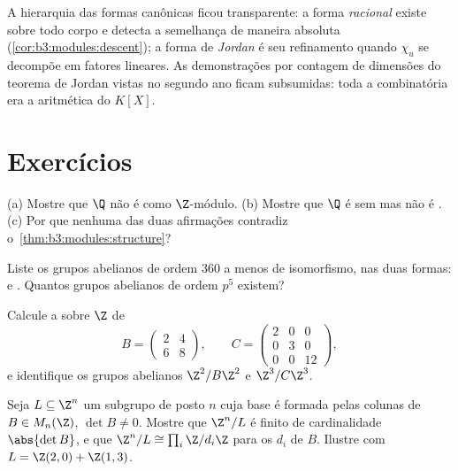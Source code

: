 \begin{remark}\label{rem:b3:modules:overview}
A hierarquia das formas canônicas ficou transparente: a forma
\emph{racional} existe sobre todo corpo e detecta a semelhança de
maneira absoluta (\cref{cor:b3:modules:descent}); a forma de \emph{Jordan} é seu
refinamento quando $\chi_u$ se decompõe em fatores lineares. As
demonstrações por contagem de dimensões do teorema de Jordan vistas no
segundo ano ficam subsumidas: toda a combinatória era a aritmética do
 $K[X]$.
\end{remark}

\section{Exercícios}

\begin{exercise}[$\star$]\label{exo:b3:modules:1}
(a) Mostre que $\Q$ não é  como $\Z$-módulo.
(b) Mostre que $\Q$ é sem  mas não é .
(c) Por que nenhuma das duas afirmações contradiz
o~\cref{thm:b3:modules:structure}?
\end{exercise}

\begin{exercise}[$\star$]\label{exo:b3:modules:2}
Liste os grupos abelianos de ordem $360$ a menos de isomorfismo,
nas duas formas:  e . Quantos
grupos abelianos de ordem $p^5$ existem?
\end{exercise}

\begin{exercise}[$\star$]\label{exo:b3:modules:3}
Calcule a  sobre $\Z$ de
\[
B = \begin{pmatrix} 2 & 4\\ 6 & 8 \end{pmatrix},
\qquad
C = \begin{pmatrix} 2 & 0 & 0\\ 0 & 3 & 0\\ 0 & 0 & 12
\end{pmatrix},
\]
e identifique os grupos abelianos $\Z^2/B\Z^2$ e $\Z^3/C\Z^3$.
\end{exercise}

\begin{exercise}[$\star\star$]\label{exo:b3:modules:4}
Seja $L \subseteq \Z^n$ um subgrupo de posto $n$ cuja base é formada pelas
colunas de $B \in M_n(\Z)$, $\det B \neq 0$. Mostre que $\Z^n/L$ é finito de
cardinalidade $\abs{\det B}$, e que $\Z^n/L
\cong \prod_i \Z/d_i\Z$ para os  $d_i$
de $B$. Ilustre com $L = \Z(2,0) + \Z(1,3)$.
\end{exercise}

